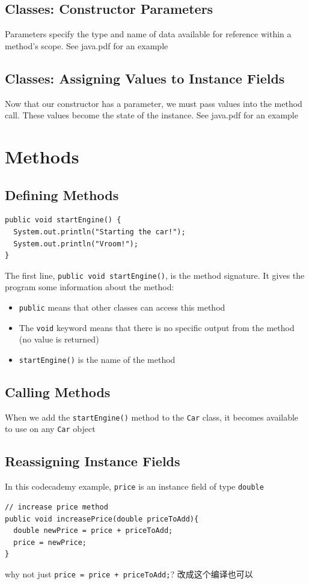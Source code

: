 \documentclass[a4paper, 12pt]{article}
\begin{document}
\subsection{Classes: Constructor Parameters}
Parameters specify the type and name of data available for reference within a method's scope. See java.pdf for an example

\subsection{Classes: Assigning Values to Instance Fields}
Now that our constructor has a parameter, we must pass values into the method call. These values become the state of the instance. See java.pdf for an example


\section{Methods}
\subsection{Defining Methods}
\begin{verbatim}
public void startEngine() {
  System.out.println("Starting the car!");
  System.out.println("Vroom!");
}
\end{verbatim}
The first line, \verb|public void startEngine()|, is the method signature. It gives the program some information about the method:
\begin{itemize}
\item \verb|public| means that other classes can access this method

\item The \verb|void| keyword means that there is no specific output from the method (no value is returned)

\item \verb|startEngine()| is the name of the method

\end{itemize}

\subsection{Calling Methods}
When we add the \verb|startEngine()| method to the \verb|Car| class, it becomes available to use on any \verb|Car| object

\subsection{Reassigning Instance Fields}
In this codecademy example, \verb|price| is an instance field of type \verb|double|
\begin{verbatim}
// increase price method
public void increasePrice(double priceToAdd){
  double newPrice = price + priceToAdd;
  price = newPrice;
}
\end{verbatim}
why not just \verb|price = price + priceToAdd;|? 改成这个编译也可以
\end{document}
